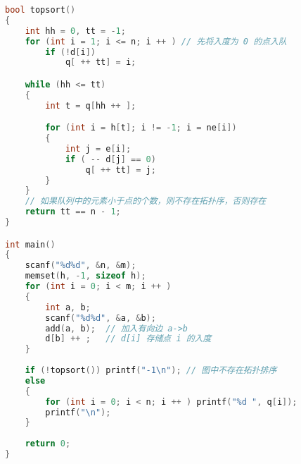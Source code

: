 \begin{lstlisting}[language=cpp]
bool topsort()
{
    int hh = 0, tt = -1;
    for (int i = 1; i <= n; i ++ ) // 先将入度为 0 的点入队
        if (!d[i])
            q[ ++ tt] = i;

    while (hh <= tt)
    {
        int t = q[hh ++ ];

        for (int i = h[t]; i != -1; i = ne[i])
        {
            int j = e[i];
            if ( -- d[j] == 0)
                q[ ++ tt] = j;
        }
    }
    // 如果队列中的元素小于点的个数，则不存在拓扑序，否则存在
    return tt == n - 1;
}

int main()
{
    scanf("%d%d", &n, &m);
    memset(h, -1, sizeof h);
    for (int i = 0; i < m; i ++ )
    {
        int a, b;
        scanf("%d%d", &a, &b);
        add(a, b);  // 加入有向边 a->b
        d[b] ++ ;   // d[i] 存储点 i 的入度
    }
    
    if (!topsort()) printf("-1\n"); // 图中不存在拓扑排序
    else
    {
        for (int i = 0; i < n; i ++ ) printf("%d ", q[i]);
        printf("\n");
    }
    
    return 0;
}
\end{lstlisting}